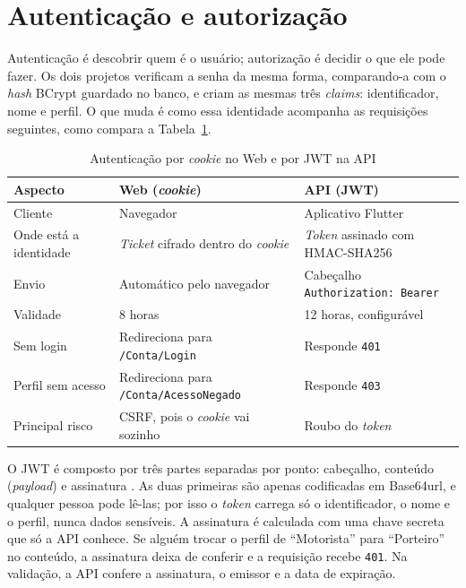 \section{Autenticação e autorização}
\label{sec:autenticacao}

Autenticação é descobrir quem é o usuário; autorização é decidir o que ele pode fazer. Os dois projetos verificam a senha da mesma forma, comparando-a com o \textit{hash} BCrypt guardado no banco, e criam as mesmas três \textit{claims}: identificador, nome e perfil. O que muda é como essa identidade acompanha as requisições seguintes, como compara a Tabela~\ref{tab:auth}.

\begin{table}[htbp]
\centering
\caption{Autenticação por \textit{cookie} no Web e por JWT na API}
\label{tab:auth}
\footnotesize
\begin{tabular}{|p{3cm}|p{5.5cm}|p{5.5cm}|}
\hline
\textbf{Aspecto} & \textbf{Web (\textit{cookie})} & \textbf{API (JWT)} \\ \hline
Cliente & Navegador & Aplicativo Flutter \\ \hline
Onde está a identidade & \textit{Ticket} cifrado dentro do \textit{cookie} & \textit{Token} assinado com HMAC-SHA256 \\ \hline
Envio & Automático pelo navegador & Cabeçalho \texttt{Authorization: Bearer} \\ \hline
Validade & 8 horas & 12 horas, configurável \\ \hline
Sem login & Redireciona para \texttt{/Conta/Login} & Responde \texttt{401} \\ \hline
Perfil sem acesso & Redireciona para \texttt{/Conta/AcessoNegado} & Responde \texttt{403} \\ \hline
Principal risco & CSRF, pois o \textit{cookie} vai sozinho & Roubo do \textit{token} \\ \hline
\end{tabular}
\end{table}

O JWT é composto por três partes separadas por ponto: cabeçalho, conteúdo (\textit{payload}) e assinatura \cite{ietf2015jwt}. As duas primeiras são apenas codificadas em Base64url, e qualquer pessoa pode lê-las; por isso o \textit{token} carrega só o identificador, o nome e o perfil, nunca dados sensíveis. A assinatura é calculada com uma chave secreta que só a API conhece. Se alguém trocar o perfil de ``Motorista'' para ``Porteiro'' no conteúdo, a assinatura deixa de conferir e a requisição recebe \texttt{401}. Na validação, a API confere a assinatura, o emissor e a data de expiração.

